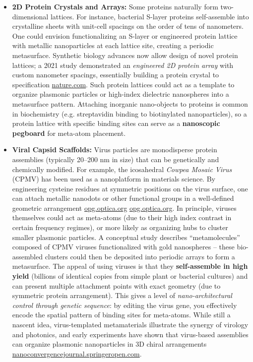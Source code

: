 \documentclass[11pt,a4paper]{article}
\begin{document}
\begin{itemize}
  \item \textbf{2D Protein Crystals and Arrays:} Some proteins naturally form two-dimensional lattices. For instance, bacterial S-layer proteins self-assemble into crystalline sheets with unit-cell spacings on the order of tens of nanometers. One could envision functionalizing an S-layer or engineered protein lattice with metallic nanoparticles at each lattice site, creating a periodic metasurface. Synthetic biology advances now allow design of novel protein lattices; a 2021 study demonstrated an \emph{engineered 2D protein array} with custom nanometer spacings, essentially building a protein crystal to specification \href{https://www.nature.com/articles/s41467-021-23966-4#:~:text=Designed and biologically active protein,desired 2D and 3D organizations}{nature.com}. Such protein lattices could act as a template to organize plasmonic particles or high-index dielectric nanospheres into a metasurface pattern. Attaching inorganic nano-objects to proteins is common in biochemistry (e.g. streptavidin binding to biotinylated nanoparticles), so a protein lattice with specific binding sites can serve as a \textbf{nanoscopic pegboard} for meta-atom placement.
  \item \textbf{Viral Capsid Scaffolds:} Virus particles are monodisperse protein assemblies (typically 20--200 nm in size) that can be genetically and chemically modified. For example, the icosahedral \emph{Cowpea Mosaic Virus} (CPMV) has been used as a nanoplatform in materials science. By engineering cysteine residues at symmetric positions on the virus surface, one can attach metallic nanodots or other functional groups in a well-defined geometric arrangement \href{https://opg.optica.org/ao/fulltext.cfm?uri=ao-54-31-f61#:~:text=Toward high throughput optical metamaterial,virus at each of}{opg.optica.org} \href{https://opg.optica.org/ao/fulltext.cfm?uri=ao-54-31-f61#:~:text=The metamolecules are composed of,virus at each of}{opg.optica.org}. In principle, viruses themselves could act as meta-atoms (due to their high index contrast in certain frequency regimes), or more likely as organizing hubs to cluster smaller plasmonic particles. A conceptual study describes ``metamolecules'' composed of CPMV viruses functionalized with gold nanospheres -- these bio-assembled clusters could then be deposited into periodic arrays to form a metasurface. The appeal of using viruses is that they \textbf{self-assemble in high yield} (billions of identical copies from simple plant or bacterial cultures) and can present multiple attachment points with exact geometry (due to symmetric protein arrangement). This gives a level of \emph{nano-architectural control through genetic sequence}: by editing the virus gene, you effectively encode the spatial pattern of binding sites for meta-atoms. While still a nascent idea, virus-templated metamaterials illustrate the synergy of virology and photonics, and early experiments have shown that virus-based assemblies can organize plasmonic nanoparticles in 3D chiral arrangements \href{https://nanoconvergencejournal.springeropen.com/articles/10.1186/s40580-020-00226-7#:~:text=match at L334 that enabled,directed helical}{nanoconvergencejournal.springeropen.com}.

\end{itemize}
\end{document}
